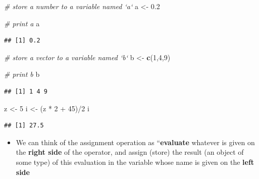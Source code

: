 \documentclass[]{book}
\newenvironment{Shaded}{\begin{snugshade}}{\end{snugshade}}
\newcommand{\KeywordTok}[1]{\textcolor[rgb]{0.13,0.29,0.53}{\textbf{{#1}}}}
\newcommand{\DecValTok}[1]{\textcolor[rgb]{0.00,0.00,0.81}{{#1}}}
\newcommand{\FloatTok}[1]{\textcolor[rgb]{0.00,0.00,0.81}{{#1}}}
\newcommand{\StringTok}[1]{\textcolor[rgb]{0.31,0.60,0.02}{{#1}}}
\newcommand{\CommentTok}[1]{\textcolor[rgb]{0.56,0.35,0.01}{\textit{{#1}}}}
\newcommand{\NormalTok}[1]{{#1}}
\providecommand{\tightlist}{%
  \setlength{\itemsep}{0pt}\setlength{\parskip}{0pt}}
\begin{document}
\begin{Shaded}
\begin{Highlighting}[]
\CommentTok{# store a number to a variable named `a`}
\NormalTok{a <-}\StringTok{ }\FloatTok{0.2}
\end{Highlighting}
\end{Shaded}

\begin{Shaded}
\begin{Highlighting}[]
\CommentTok{# print a}
\NormalTok{a}
\end{Highlighting}
\end{Shaded}

\begin{verbatim}
## [1] 0.2
\end{verbatim}

\begin{Shaded}
\begin{Highlighting}[]
\CommentTok{# store a vector to a variable named `b`}
\NormalTok{b <-}\StringTok{ }\KeywordTok{c}\NormalTok{(}\DecValTok{1}\NormalTok{,}\DecValTok{4}\NormalTok{,}\DecValTok{9}\NormalTok{)}
\end{Highlighting}
\end{Shaded}

\begin{Shaded}
\begin{Highlighting}[]
\CommentTok{# print b}
\NormalTok{b}
\end{Highlighting}
\end{Shaded}

\begin{verbatim}
## [1] 1 4 9
\end{verbatim}

\begin{Shaded}
\begin{Highlighting}[]
\NormalTok{z <-}\StringTok{ }\DecValTok{5}
\NormalTok{i <-}\StringTok{ }\NormalTok{(z *}\StringTok{ }\DecValTok{2} \NormalTok{+}\StringTok{ }\DecValTok{45}\NormalTok{)/}\DecValTok{2}
\NormalTok{i}
\end{Highlighting}
\end{Shaded}

\begin{verbatim}
## [1] 27.5
\end{verbatim}

\begin{itemize}
\tightlist
\item
  We can think of the assignment operation as ``\textbf{evaluate}
  whatever is given on the \textbf{right side} of the operator, and
  assign (store) the result (an object of some type) of this evaluation
  in the variable whose name is given on the \textbf{left side}
\end{itemize}
\end{document}
